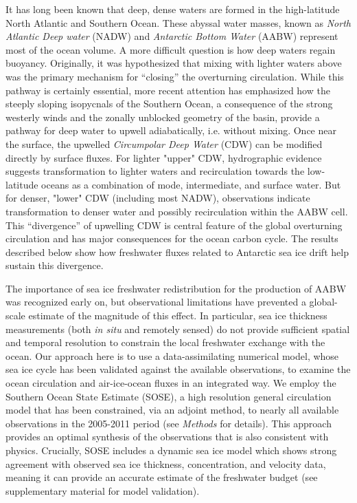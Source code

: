 \documentclass{naturemod}
\begin{document}
It has long been known that deep, dense waters are formed in the high-latitude North Atlantic and Southern Ocean\cite{Broecker1991}. These abyssal water masses, known as {\em North Atlantic Deep water} (NADW) and {\em Antarctic Bottom Water} (AABW) represent most of the ocean volume. A more difficult question is how deep waters regain buoyancy. Originally, it was hypothesized that mixing with lighter waters above was the primary mechanism for ``closing'' the overturning circulation\cite{StommelArons1959,Munk1966,Ferrari2014}. While this pathway is certainly essential, more recent attention has emphasized how the steeply sloping isopycnals of the Southern Ocean, a consequence of the strong westerly winds and the zonally unblocked geometry of the basin, provide a pathway for deep water to upwell adiabatically, i.e. without mixing\cite{ToggweilerSamuels1995,WolfeCessi2011,NikurashinVallis2012}. Once near the surface, the upwelled {\em Circumpolar Deep Water} (CDW) can be modified directly by surface fluxes. For lighter "upper" CDW, hydrographic evidence suggests transformation to lighter waters and recirculation towards the low-latitude oceans as a combination of mode, intermediate, and surface water\cite{MarshallSpeer2012,RintoulNaveiraGarabato2013}. But for denser, "lower" CDW (including most NADW), observations indicate transformation to denser water and possibly recirculation within the AABW cell\cite{Talley2013}. This ``divergence'' of upwelling CDW is central feature of the global overturning circulation and has major consequences for the ocean carbon cycle\cite{MarinovEtAl2006}. The results described below show how freshwater fluxes related to Antarctic sea ice drift help sustain this divergence.

The importance of sea ice freshwater redistribution for the production of AABW was recognized early on\cite{Gill1973}, but observational limitations have prevented a global-scale estimate of the magnitude of this effect. In particular, sea ice thickness measurements (both {\em in situ} and remotely sensed) do not provide sufficient spatial and temporal resolution to constrain the local freshwater exchange with the ocean\cite{RenEtAl2011,HollandKwok2012,HollandEtAl2014}. Our approach here is to use a data-assimilating numerical model, whose sea ice cycle has been validated against the available observations, to examine the ocean circulation and air-ice-ocean fluxes in an integrated way. We employ the Southern Ocean State Estimate (SOSE), a high resolution general circulation model that has been constrained, via an adjoint method, to nearly all available observations in the 2005-2011 period (see {\em Methods} for details). This approach provides an optimal synthesis of the observations that is also consistent with physics. Crucially, SOSE includes a dynamic sea ice model which shows strong agreement with observed sea ice thickness, concentration, and velocity data, meaning it can provide an accurate estimate of the freshwater budget (see supplementary material for model validation).
\end{document}

